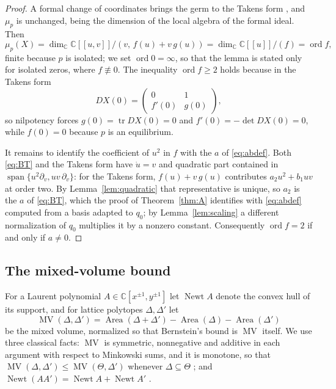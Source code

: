 \documentclass[12pt]{article}
\theoremstyle{plain}
\theoremstyle{definition}
\theoremstyle{remark}
\newcommand{\C}{\mathbb{C}}
\newcommand{\tr}{\operatorname{tr}}
\DeclareMathOperator{\dt}{det}
\DeclareMathOperator{\MV}{MV}
\DeclareMathOperator{\Newt}{Newt}
\DeclareMathOperator{\ordop}{ord}
\begin{document}
	\begin{proof}
		A formal change of coordinates brings the germ to the Takens form
		\cite{Takens1974,Dumortier1977,DLA2006}, and $\mu_{p}$ is unchanged,
		being the dimension of the local algebra of the formal ideal.  Then
		\[
		\mu_{p}(X)=\dim_{\C}\C[[u,v]]/(v,\,f(u)+v\,g(u))
		=\dim_{\C}\C[[u]]/(f)=\operatorname{ord}f ,
		\]
		finite because $p$ is isolated; we set $\ordop 0=\infty$, so that the
		lemma is stated only for isolated zeros, where $f\not\equiv0$.  The
		inequality
		$\operatorname{ord}f\ge2$ holds because in the Takens form
		\[
		DX(0)=\begin{pmatrix}0&1\\ f'(0)&g(0)\end{pmatrix},
		\]
		so nilpotency forces $g(0)=\tr DX(0)=0$ and $f'(0)=-\dt DX(0)=0$,
		while $f(0)=0$ because $p$ is an equilibrium.
		
		It remains to identify the coefficient of $u^{2}$ in $f$ with the $a$
		of \eqref{eq:abdef}.  Both \eqref{eq:BT} and the Takens form have
		$\dot u=v$ and quadratic part contained in
		$\operatorname{span}\{u^{2}\partial_{v},uv\,\partial_{v}\}$: for the
		Takens form, $f(u)+v\,g(u)$ contributes $a_{2}u^{2}+b_{1}uv$ at order
		two.  By Lemma~\ref{lem:quadratic} that representative is unique, so
		$a_{2}$ is the $a$ of \eqref{eq:BT}, which the proof of
		Theorem~\ref{thm:A} identifies with \eqref{eq:abdef} computed from a
		basis adapted to $q_{0}$; by Lemma~\ref{lem:scaling} a different
		normalization of $q_{0}$ multiplies it by a nonzero constant.
		Consequently $\operatorname{ord}f=2$ if and only if $a\neq0$.
	\end{proof}
	
	\subsection{The mixed-volume bound}
	
	For a Laurent polynomial $A\in\C[x^{\pm1},y^{\pm1}]$ let $\Newt A$
	denote the convex hull of its support, and for lattice polytopes
	$\Delta,\Delta'$ let
	\[
	\MV(\Delta,\Delta')
	=\operatorname{Area}(\Delta+\Delta')-\operatorname{Area}(\Delta)
	-\operatorname{Area}(\Delta')
	\]
	be the mixed volume, normalized so that Bernstein's bound is $\MV$
	itself.  We use three classical facts: $\MV$ is symmetric, nonnegative
	and additive in each argument with respect to Minkowski sums, and it is
	monotone, so that $\MV(\Delta,\Delta')\le\MV(\Theta,\Delta')$ whenever
	$\Delta\subseteq\Theta$ \cite[Ch.~5]{Schneider2014}; and
	$\Newt(AA')=\Newt A+\Newt A'$ \cite[Ch.~7]{CLO}.
	
\end{document}
